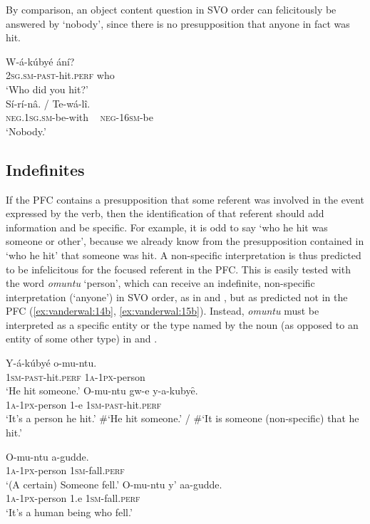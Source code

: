 \documentclass[output=paper]{langsci/langscibook}
\begin{document}
By comparison, an object content question in SVO order  can felicitously be answered by ‘nobody’, since there is no presupposition that anyone in fact was hit.

\ea\label{ex:vanderwal:13}
\gll W-á-kúbyé    ání?\\
     \textsc{2sg.sm-past}-hit.\textsc{perf}  who\\
\glt ‘Who did you hit?’\\{}
\gll Sí-rí-nâ.      /   Te-wá-lî.\\
     \textsc{neg.1sg.sm}-be-with  ~  \textsc{neg-16sm}-be\\
\glt ‘Nobody.’
\z

\subsection{Indefinites}\label{sec:vanderwal:3.2} %

If the PFC contains a presupposition that some referent was involved in the event expressed by the verb, then the identification of that referent should add information and be specific. For example, it is odd to say ‘who he hit was someone or other’, because we already know from the presupposition contained in ‘who he hit’ that someone was hit. A non-specific interpretation is thus predicted to be infelicitous for the focused referent in the PFC. This is easily tested with the word \textit{omuntu} ‘person’, which can receive an indefinite, non-specific interpretation (‘anyone’) in SVO order, as in  and , but as predicted not in the PFC (\ref{ex:vanderwal:14b}, \ref{ex:vanderwal:15b}). Instead, \textit{omuntu} must be interpreted as a specific entity or the type named by the noun (as opposed to an entity of some other type) in  and .

\ea\label{ex:vanderwal:14}
\ea\label{ex:vanderwal:14a}
\gll    Y-á-kúbyé    o-mu-ntu.\\
         \textsc{1sm-past}-hit.\textsc{perf}  \textsc{1a-1px}-person\\
\glt     ‘He hit someone.’
\ex\label{ex:vanderwal:14b}
\gll    O-mu-ntu    gw-e  y-a-kubyȇ.\\
         \textsc{1a-1px}-person  1-e  \textsc{1sm-past}-hit.\textsc{perf}\\
\glt     ‘It’s a person he hit.’ 
\glt     \#‘He hit someone.’ / \#‘It is someone (non-specific) that he hit.’
\z
\z

\ea\label{ex:vanderwal:15}
\ea\label{ex:vanderwal:15a}
\gll   O-mu-ntu    a-gudde.\\
         \textsc{1a-1px}-person  1\textsc{sm}-fall.\textsc{perf}\\
\glt     ‘(A certain) Someone fell.’
\ex\label{ex:vanderwal:15b}
\gll     O-mu-ntu    y’  aa-gudde.\\
         \textsc{1a-1px}-person  1.e  \textsc{1sm}-fall.\textsc{perf}\\
\glt     ‘It’s a human being who fell.’
\end{document}
